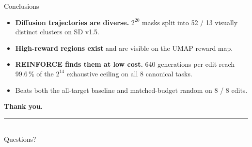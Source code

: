\documentclass[10pt,aspectratio=169]{beamer}
\newcommand{\key}[1]{\textcolor{accent}{\textbf{#1}}}
\begin{document}
\begin{frame}{Conclusions}
  \begin{itemize}
    \item \key{Diffusion trajectories are diverse.} $2^{20}$ masks split into 52 / 13 visually distinct clusters on SD v1.5.
    \item \key{High-reward regions exist} and are visible on the UMAP reward map.
    \item \key{REINFORCE finds them at low cost.} 640 generations per edit reach 99.6\,\% of the $2^{14}$ exhaustive ceiling on all 8 canonical tasks.
    \item Beats both the all-target baseline and matched-budget random on 8 / 8 edits.
  \end{itemize}

  \vspace{1.2em}
  \begin{center}
    {\Large\bfseries Thank you.}\\[0.4em]
    \textcolor{accent}{\rule{0.18\textwidth}{1.2pt}}\\[0.5em]
    {\normalsize Questions?}
  \end{center}
\end{frame}
\end{document}
